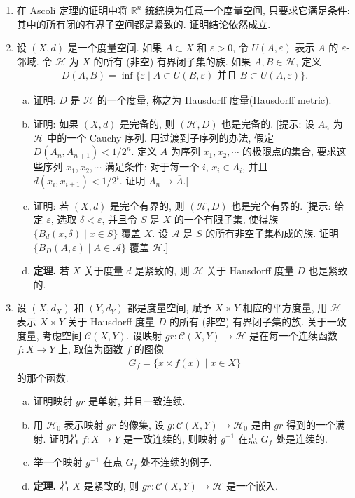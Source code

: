\documentclass[../../main.tex]{subfiles}
\begin{document}
\begin{enumerate}
\begin{quote}
\end{quote}
[提示: 用 $Y$ 表示 $X$ 的单点紧致化, 证明若赋予 $\mathcal{C}_0(X,\mathbb{R})$ 和 $\mathcal{C}(Y,\mathbb{R})$ 上确界度量, 则 $\mathcal{C}_0(X,\mathbb{R})$ 等距于 $\mathcal{C}(Y,\mathbb{R})$ 的一个闭子空间.]
\item 在 Ascoli 定理的证明中将 $\mathbb{R}^n$ 统统换为任意一个度量空间, 只要求它满足条件: 其中的所有闭的有界子空间都是紧致的. 证明结论依然成立.
\item 设 $(X,d)$ 是一个度量空间. 如果 $A\subset X$ 和 $\varepsilon>0$, 令 $U(A,\varepsilon)$ 表示 $A$ 的 $\varepsilon$-邻域. 令 $\mathcal{H}$ 为 $X$ 的所有 (非空) 有界闭子集的族. 如果 $A,B\in\mathcal{H}$, 定义
\begin{align*}
D(A,B)=\inf\{\varepsilon\mid A\subset U(B,\varepsilon)\text{ 并且 }B\subset U(A,\varepsilon)\}.
\end{align*}
\begin{enumerate}[(a)]
\item 证明: $D$ 是 $\mathcal{H}$ 的一个度量, 称之为 Hausdorff 度量(Hausdorff metric).
\item 证明: 如果 $(X,d)$ 是完备的, 则 $(\mathcal{H},D)$ 也是完备的. [提示: 设 $A_n$ 为 $\mathcal{H}$ 中的一个 Cauchy 序列. 用过渡到子序列的办法, 假定 $D(A_n,A_{n+1})<1/2^n$. 定义 $A$ 为序列 $x_1,x_2,\cdots$ 的极限点的集合, 要求这些序列 $x_1,x_2,\cdots$ 满足条件: 对于每一个 $i$, $x_i\in A_i$, 并且 $d(x_i,x_{i+1})<1/2^i$. 证明 $A_n\to\overline{A}$.]
\item 证明: 若 $(X,d)$ 是完全有界的, 则 $(\mathcal{H},D)$ 也是完全有界的. [提示: 给定 $\varepsilon$, 选取 $\delta<\varepsilon$, 并且令 $S$ 是 $X$ 的一个有限子集, 使得族 $\{B_d(x,\delta)\mid x\in S\}$ 覆盖 $X$. 设 $\mathcal{A}$ 是 $S$ 的所有非空子集构成的族. 证明 $\{B_D(A,\varepsilon)\mid A\in\mathcal{A}\}$ 覆盖 $\mathcal{H}$.]
\item \textbf{定理.} 若 $X$ 关于度量 $d$ 是紧致的, 则 $\mathcal{H}$ 关于 Hausdorff 度量 $D$ 也是紧致的.
\end{enumerate}
\item 设 $(X,d_X)$ 和 $(Y,d_Y)$ 都是度量空间, 赋予 $X\times Y$ 相应的平方度量, 用 $\mathcal{H}$ 表示 $X\times Y$ 关于 Hausdorff 度量 $D$ 的所有 (非空) 有界闭子集的族. 关于一致度量, 考虑空间 $\mathcal{C}(X,Y)$. 设映射 $gr\colon\mathcal{C}(X,Y)\to\mathcal{H}$ 是在每一个连续函数 $f\colon X\to Y$ 上, 取值为函数 $f$ 的图像
\begin{align*}
G_f=\{x\times f(x)\mid x\in X\}
\end{align*}
的那个函数.
\begin{enumerate}[(a)]
\item 证明映射 $gr$ 是单射, 并且一致连续.
\item 用 $\mathcal{H}_0$ 表示映射 $gr$ 的像集, 设 $g\colon\mathcal{C}(X,Y)\to\mathcal{H}_0$ 是由 $gr$ 得到的一个满射. 证明若 $f\colon X\to Y$ 是一致连续的, 则映射 $g^{-1}$ 在点 $G_f$ 处是连续的.
\item 举一个映射 $g^{-1}$ 在点 $G_f$ 处不连续的例子.
\item \textbf{定理.} 若 $X$ 是紧致的, 则 $gr\colon\mathcal{C}(X,Y)\to\mathcal{H}$ 是一个嵌入.
\end{enumerate}
\end{enumerate}
\end{document}
